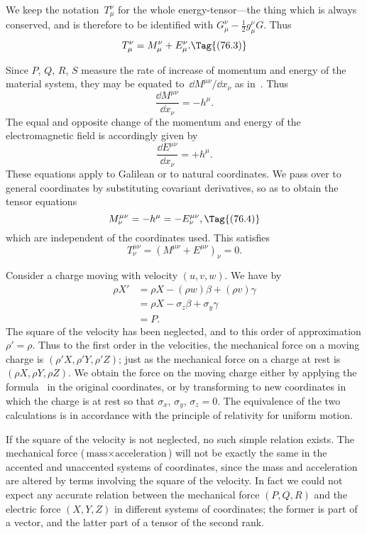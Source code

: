 \documentclass[12pt]{book}
\begin{document}
{\Loosen We keep the notation~$T_{\mu}^{\nu}$ for the whole energy\hyp{}tensor---the thing which
is always conserved, and is therefore to be identified with $G_{\mu}^{\nu} - \frac{1}{2}g_{\mu}^{\nu}G$. Thus}
\[
T_{\mu}^{\nu} = M_{\mu}^{\nu} + E_{\mu}^{\nu}.
\Tag{(76.3)}
\]

Since $P$, $Q$, $R$, $S$ measure the rate of increase of momentum and energy
of the material system, they may be equated to~$\dd M^{\mu\nu}/\dd x_{\nu}$ as in~. Thus
\[
\frac{\dd M^{\mu\nu}}{\dd x_{\nu}} = -h^{\mu}.
\]
The equal and opposite change of the momentum and energy of the electromagnetic
field is accordingly given by
\[
\frac{\dd E^{\mu\nu}}{\dd x_{\nu}} = +h^{\mu}.
\]
These equations apply to Galilean or to natural coordinates. We pass over to
general coordinates by substituting covariant derivatives, so as to obtain the
tensor equations
\[
M_{\nu}^{\mu\nu} = -h^{\mu} = -E_{\nu}^{\mu\nu},
\Tag{(76.4)}
\]
which are independent of the coordinates used. This satisfies
\[
T_{\nu}^{\mu\nu} = (M^{\mu\nu} + E^{\mu\nu})_{\nu} = 0.
\]

Consider a charge moving with velocity $(u, v, w)$. We have by~
\begin{align*}
  \rho X' &= \rho X - (\rho w)\beta + (\rho v)\gamma \\
  &= \rho X - \sigma_{z}\beta + \sigma_{y}\gamma \\
&= P.
\end{align*}
The square of the velocity has been neglected, and to this order of approximation
$\rho' = \rho$. Thus to the first order in the velocities, the mechanical force on
a moving charge is $(\rho'X, \rho'Y, \rho'Z)$; just as the mechanical force on a charge
at rest is $(\rho X, \rho Y, \rho Z)$. We obtain the force on the moving charge either by
applying the formula~ in the original coordinates, or by transforming to
new coordinates in which the charge is at rest so that $\sigma_{x}$, $\sigma_{y}$, $\sigma_{z} = 0$. The
equivalence of the two calculations is in accordance with the principle of
relativity for uniform motion.

If the square of the velocity is not neglected, no such simple relation
exists. The mechanical force ($\text{mass} \times \text{acceleration}$) will not be exactly the same
in the accented and unaccented systems of coordinates, since the mass and
acceleration are altered by terms involving the square of the velocity. In
fact we could not expect any accurate relation between the mechanical force
$(P, Q, R)$ and the electric force $(X, Y, Z)$ in different systems of coordinates; the
former is part of a vector, and the latter part of a tensor of the second rank.
\end{document}
